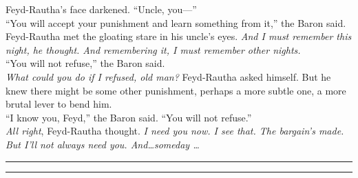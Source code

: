\documentclass[12pt,letterpaper]{memoir}
\begin{document}
Feyd-Rautha’s face darkened. “Uncle, you—”\\
“You will accept your punishment and learn something from it,” the Baron said.\\
Feyd-Rautha met the gloating stare in his uncle’s eyes. \textit{And I must remember this night, he thought. And remembering it, I must remember other nights.}\\
“You will not refuse,” the Baron said.\\
\textit{What could you do if I refused, old man?} Feyd-Rautha asked himself. But he knew there might be some other punishment, perhaps a more subtle one, a more brutal lever to bend him.\\
“I know you, Feyd,” the Baron said. “You will not refuse.”\\
\textit{All right}, Feyd-Rautha thought. \textit{I need you now. I see that. The bargain’s made. But I’ll not always need you. And\ldots someday \ldots} 
\fancybreak{* * *}
\fancybreak{* * *}
\printbibliography
\end{document}
